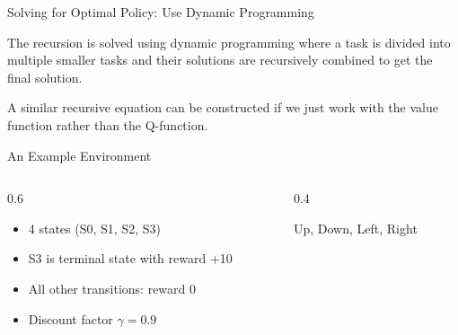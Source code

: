 \documentclass[aspectratio=169,xcolor=dvipsnames,svgnames,x11names,fleqn]{beamer}
\begin{document}

\begin{frame}{Solving for Optimal Policy: Use Dynamic Programming}

The recursion is solved using dynamic programming where a task is divided into multiple smaller tasks and their solutions are recursively combined to get the final solution.

\vspace{15pt}
A similar recursive equation can be constructed if we just work with the value function rather than the Q-function. 
    
\end{frame}


\begin{frame}{An Example Environment}
\small
    \begin{columns}
        \begin{column}{0.6\textwidth}
            \begin{tcolorbox}[colback=lightblue!30,colframe=blue!60!black,title=Grid World Setup]
                \begin{itemize}
                    \item 4 states (S0, S1, S2, S3)
                    \item S3 is terminal state with reward +10
                    \item All other transitions: reward 0
                    \item Discount factor $\gamma = 0.9$
                \end{itemize}
            \end{tcolorbox}


        \end{column}
        \begin{column}{0.4\textwidth}
            \begin{tcolorbox}[colback=lightorange!30,colframe=orange!60!black,title=Available Actions]
                Up, Down, Left, Right
            \end{tcolorbox}

            \begin{center}
            \end{center}

        \end{column}
    \end{columns}
    
    
\end{frame}
\end{document}
